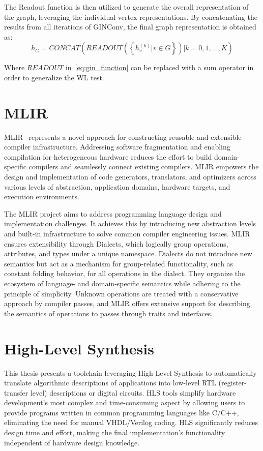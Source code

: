 The Readout function is then utilized to generate the overall representation of the graph, leveraging the individual vertex representations.
By concatenating the results from all iterations of GINConv, the final graph representation is obtained as:
\begin{equation}
    \label{eq:gin_readout}
    h_G = CONCAT \left( READOUT \left( \left\{ h_v^{(k)} | v \in G \right\} \right) | k = 0, 1, ..., K \right)
\end{equation}

Where $READOUT$ in~\ref{eq:gin_function} can be replaced with a sum operator in order to generalize the WL test.

\section{MLIR}
\label{sec:mlir}%
MLIR~\cite{9370308} represents a novel approach for constructing reusable and extensible compiler infrastructure.
Addressing software fragmentation and enabling compilation for heterogeneous hardware reduces the effort to build domain-specific compilers and seamlessly connect existing compilers.
MLIR empowers the design and implementation of code generators, translators, and optimizers across various levels of abstraction, application domains, hardware targets, and execution environments.

The MLIR project aims to address programming language design and implementation challenges.
It achieves this by introducing new abstraction levels and built-in infrastructure to solve common compiler engineering issues.
MLIR ensures extensibility through Dialects, which logically group operations, attributes, and types under a unique namespace.
Dialects do not introduce new semantics but act as a mechanism for group-related functionality, such as constant folding behavior, for all operations in the dialect.
They organize the ecosystem of language- and domain-specific semantics while adhering to the principle of simplicity.
Unknown operations are treated with a conservative approach by compiler passes, and MLIR offers extensive support for describing the semantics of operations to passes through traits and interfaces.

\section{High-Level Synthesis}
\label{sec:hls}%

This thesis presents a toolchain leveraging High-Level Synthesis to automatically translate algorithmic descriptions of applications into low-level RTL (register-transfer level) descriptions or digital circuits.
HLS tools simplify hardware development's most complex and time-consuming aspect by allowing users to provide programs written in common programming languages like C/C++, eliminating the need for manual VHDL/Verilog coding.
HLS significantly reduces design time and effort, making the final implementation's functionality independent of hardware design knowledge.


